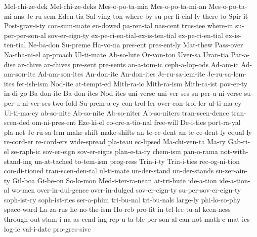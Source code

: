 {Mel-chi-ze-dek
Mel-chi-ze-deks
Mes-o-po-ta-mia
Mes-o-po-ta-mi-an
Mes-o-po-ta-mi-ans
Je-ru-sem
Eden-tia
Sal-ving-ton
where-by
su-per-fi-cial-ly
there-to
Spir-it
Post-grav-i-ty
con-sum-mate
en-dowed
pa-ren-tal
nas-cent
trus-tee
where-in
su-per-per-son-al
sov-er-eign-ty
ex-pe-ri-en-tial-ex-is-ten-tial
ex-pe-ri-en-tial
ex-is-ten-tial
Ne-ba-don
Su-preme
Ha-vo-na
pres-ent
pres-ent-ly
Mat-thew
Pass-over
Na-tha-ni-el
ap-proach
Ul-ti-mate
Ab-so-lute
Or-von-ton
Uver-sa
Uran-tia
Par-a-dise
ar-chive
ar-chives
pre-sent
pre-sents
an-a-tom-ic
ceph-a-lop-ods
Ad-am-ic
Ad-am-son-ite
Ad-am-son-ites
An-don-ite
An-don-ites
Je-ru-sa-lem-ite
Je-ru-sa-lem-ites
fet-ish-ism
Nod-ite
at-tempt-ed
Mith-ra-ic
Mith-ra-ism
Mith-ra-ist
pov-er-ty
in-di-go
Ba-don-ite
Ba-don-ites
Nod-ites
uni-verse
uni-ver-ses
su-per-u-ni-verse
su-per-u-ni-ver-ses
two-fold
Su-prem-a-cy
con-trol-ler
over-con-trol-ler
ul-ti-ma-cy
Ul-ti-ma-cy
ab-so-nite
Ab-so-nite
Ab-so-niter
Ab-so-niters
tran-scen-dence
tran-scen-ded
om-ni-pres-ent
Eze-ki-el
co-cre-a-tio-nal
free-will
De-i-ties
port-ra-yal
pla-net
Je-ru-sa-lem
make-shift
make-shifts
an-te-ce-dent
an-te-ce-dent-ly
equal-ly
re-cord-er
re-cord-ers
wide-spread
pla-teau
ec-lipsed
Ma-chi-ven-ta
Ma-ry
Gab-ri-el
se-raph-ic
sov-er-eign
sov-er-eigns
plan-e-ta-ry
chem-ism
pan-o-rama
not-with-stand-ing
un-at-tached
to-tem-ism
prog-ress
Trin-i-ty
Trin-i-ties
rec-og-ni-tion
con-di-tioned
tran-scen-den-tal
ul-ti-mate
un-der-stand
un-der-stands
su-zer-ain-ty
Gil-boa
Gi-be-on
So-lo-mon
Med-i-ter-ra-nean
at-tri-bute
ide-a-tion
ide-a-tion-al
wo-men
over-in-dul-gence
over-in-dulged
sov-er-eign-ty
su-per-sov-er-eign-ty
soph-ist-ry
soph-ist-ries
ser-a-phim
tri-bu-nal
tri-bu-nals
large-ly
phi-lo-so-phy
space-ward
La-za-rus
he-no-the-ism
Ho-reb
pro-fit
in-tel-lec-tu-al
keen-ness
through-out
stam-i-na
as-cend-ing
rep-u-ta-ble
per-son-al
can-not
math-e-mat-ics
log-ic
val-i-date
pro-gres-sive
}
